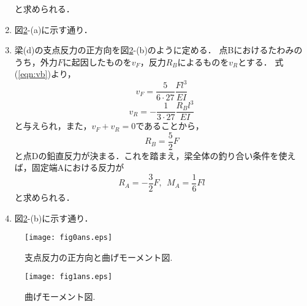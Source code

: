 ﻿\documentclass[10pt,a4j]{jarticle}
\begin{document}
\begin{enumerate}
\begin{equation}
	\label{eqn:forces_A_b}
\end{equation}
と求められる．
\item
図\ref{fig:fig1}-(a)に示す通り．
\item
梁(d)の支点反力の正方向を図\ref{fig:fig1}-(b)のように定める．
点Bにおけるたわみのうち，外力$F$に起因したものを$v_F$，反力$R_B$によるものを$v_R$とする．
式(\ref{eqn:vb})より，
\begin{equation}
	v_F=\frac{5}{6\cdot 27}\frac{Fl^3}{EI}
	\label{eqn:vF_d}
\end{equation}
\begin{equation}
	v_R=-\frac{1}{3\cdot 27}\frac{R_Bl^3}{EI}
	\label{eqn:vR_d}
\end{equation}
と与えられ，また，$v_F+v_R=0$であることから，
\begin{equation}
	R_B=\frac{5}{2}F
	\label{eqn:RB_d}
\end{equation}
と点Dの鉛直反力が決まる．これを踏まえ，梁全体の釣り合い条件を使えば，固定端Aにおける反力が
\begin{equation}
	R_A=-\frac{3}{2}F, \ \ M_A=\frac{1}{6}Fl
	\label{eqn:forces_A_d}
\end{equation}
と求められる．
\item
図\ref{fig:fig1}-(b)に示す通り．
\end{enumerate}
\begin{figure}[h]
	\begin{center}
	\texttt{[image: fig0ans.eps]} 
	\end{center}
	\caption{支点反力の正方向と曲げモーメント図.}
	\label{fig:fig0}
\end{figure}
\begin{figure}[h]
	\begin{center}
	\texttt{[image: fig1ans.eps]} 
	\end{center}
	\caption{曲げモーメント図.} 
	\label{fig:fig1}
\end{figure}
\end{document}
